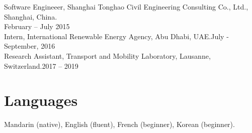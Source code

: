 \documentclass[letterpaper,11pt]{article}
\begin{document}
\begin{itemize}[leftmargin=0.15in, label={}]
	{\item{
			{{Software Engineeer},  Shanghai Tonghao Civil Engineering Consulting Co., Ltd., Shanghai, China.}{
			 {\\ \hfill February -- July 2015\,\,}} \\
			{{Intern},  International Renewable Energy Agency, Abu Dhabi, UAE.}{\hfill {July - September, 2016\,\,}} \\
			{{Research Assistant},  Transport and Mobility Laboratory,  Lausanne, Switzerland.}{\hfill {2017 -- 2019\,\,}} \\
			
	}}
\end{itemize}

\section{Languages}
\quad Mandarin ({native}), English ({fluent}), French ({beginner}),  Korean ({beginner}).
\end{document}
